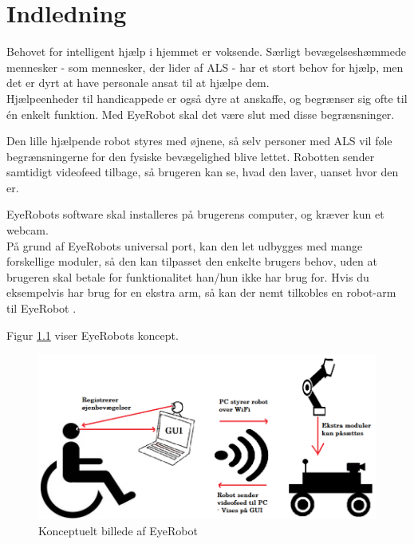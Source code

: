 \chapter{Indledning}
Behovet for intelligent hjælp i hjemmet er voksende. Særligt bevægelseshæmmede mennesker - som mennesker, der lider af ALS - har et stort behov for hjælp, men det er dyrt at have personale ansat til at hjælpe dem. \\ 
Hjælpeenheder til handicappede er også dyre at anskaffe, og begrænser sig ofte til én enkelt funktion. Med EyeRobot skal det være slut med disse begrænsninger.

Den lille hjælpende robot styres med øjnene, så selv personer med ALS vil føle begrænsningerne for den fysiske bevægelighed blive lettet. 
Robotten sender samtidigt videofeed tilbage, så brugeren kan se, hvad den laver, uanset hvor den er.

EyeRobots software skal installeres på brugerens computer, og kræver kun et webcam. \\
På grund af EyeRobots universal port, kan den let udbygges med mange forskellige moduler, så den kan tilpasset den enkelte brugers behov, uden at brugeren skal betale for funktionalitet han/hun ikke har brug for. 
Hvis du eksempelvis har brug for en ekstra arm, så kan der nemt tilkobles en robot-arm til EyeRobot \cite{moscow}.

Figur \ref{fig:Rigt_billede} viser EyeRobots koncept.

\begin{figure}[tbph]
	\centering
	\includegraphics[width = \textwidth]{figur/Rigt_billede.png}
	\caption{Konceptuelt billede af EyeRobot}
	\label{fig:Rigt_billede}
\end{figure}